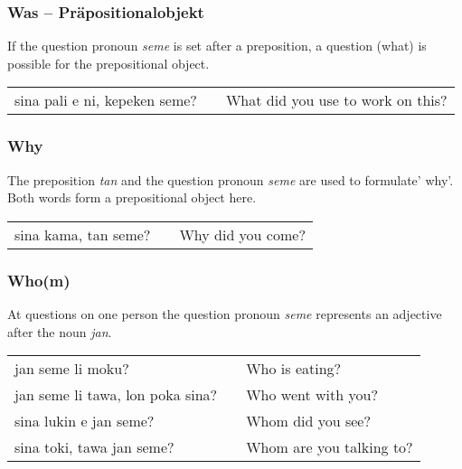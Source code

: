 \subsubsection*{Was -- Präpositionalobjekt}
%
If the question pronoun \textit{seme} is set after a preposition, a question (what) is possible for the prepositional object.

\begin{supertabular}{p{5,5cm}|ll}
sina pali e ni, kepeken seme? &&  What did you use to work on this? \\
\end{supertabular} 
%
{}
\subsubsection*{Why}
%
The preposition \textit{tan} and the question pronoun \textit{seme} are used to formulate' why'. 
Both words form a prepositional object here.

\begin{supertabular}{p{5,5cm}|ll}
sina kama, tan seme? && Why did you come? \\
\end{supertabular} 
%
\subsubsection*{Who(m)}
%
At questions on one person the question pronoun \textit{seme} represents an adjective after the noun \textit{jan}. 

\begin{supertabular}{p{5,5cm}|ll}
jan seme li moku? && Who is eating? \\
jan seme li tawa, lon poka sina? && Who went with you? \\
sina lukin e jan seme? && Whom did you see? \\
sina toki, tawa jan seme? && Whom are you talking to? \\
\end{supertabular} 
%
